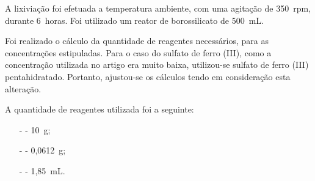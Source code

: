 A lixiviação foi efetuada a temperatura ambiente, com uma agitação de 350~rpm, durante 6~horas.
Foi utilizado um reator de borossilicato de 500~mL.

Foi realizado o cálculo da quantidade de reagentes necessários, para as concentrações estipuladas. 
Para o caso do sulfato de ferro (III), como a concentração utilizada no artigo era muito baixa, utilizou-se sulfato de ferro (III) pentahidratado. Portanto, ajustou-se os cálculos tendo em consideração esta alteração.

A quantidade de reagentes utilizada foi a seguinte:
\begin{itemize}
    \item[-] \tio{} - 10~g;
    \item[-] \sulfe{} - 0,0612~g;
    \item[-] \acsul{} - 1,85~mL.
\end{itemize}

